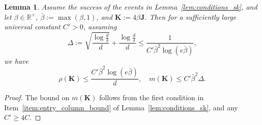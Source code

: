 \documentclass[11pt]{article}
\newtheorem{lemma}{Lemma}
\newcommand{\defeq}{:=}
\newcommand{\R}{\mathbb{R}}
\newcommand{\1}{\mathbf{1}}
\newcommand{\0}{\mathbf{0}}
\newcommand{\mj}{{\mathbf{J}}}
\newcommand{\mk}{{\mathbf{K}}}
\begin{document}
\begin{lemma}\label{lem:improved_rho}
Assume the success of the events in Lemma~\ref{lem:conditions_sk}, and let $\beta \in \R^+$, $\bar{\beta} \defeq \max(\beta, 1)$, and $\mk \defeq 4\beta\mj$. Then for a sufficiently large universal constant $C' > 0$, assuming
\begin{equation}\label{eq:delta_condition}\Delta \defeq \sqrt{\frac{\log \frac d \delta}{d}} + \frac{\log \frac d \delta} d \le \frac 1 {C' \bar{\beta}^2\log(e\bar{\beta})},\end{equation}
we have
\[\rho(\mk)\le \frac{C'\bar{\beta}^2\log(e\bar{\beta})}{d},\quad m(\mk) \le C'\bar{\beta}^2 \Delta. \]
\end{lemma}
\begin{proof}
The bound on $m(\mk)$ follows from the first condition in Item~\ref{item:entry_column_bound} of Lemma~\ref{lem:conditions_sk}, and any $C' \ge 4C$. 


\end{proof}
\end{document}
